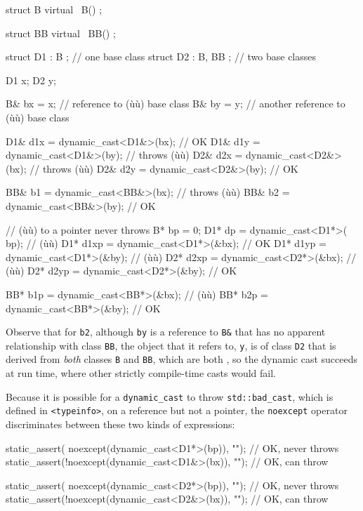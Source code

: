 \begin{emcppslisting}[emcppsbatch=e1]
struct B
{
   virtual ~B() {}
};

struct BB
{
   virtual ~BB() {}
};

struct D1 : B     { };  // one base class
struct D2 : B, BB { };  // two base classes

D1 x;
D2 y;

B& bx = x;  // reference to (ù{}ù) base class
B& by = y;  // another reference to (ù{}ù) base class

D1& d1x = dynamic_cast<D1&>(bx);    // OK
D1& d1y = dynamic_cast<D1&>(by);    // throws (ù{}ù)
D2& d2x = dynamic_cast<D2&>(bx);    // throws (ù{}ù)
D2& d2y = dynamic_cast<D2&>(by);    // OK

BB& b1 = dynamic_cast<BB&>(bx);     // throws (ù{}ù)
BB& b2 = dynamic_cast<BB&>(by);     // OK

// (ù{}ù) to a pointer never throws
B*  bp   = 0;
D1* dp   = dynamic_cast<D1*>( bp);  // (ù{}ù)
D1* d1xp = dynamic_cast<D1*>(&bx);  // OK
D1* d1yp = dynamic_cast<D1*>(&by);  // (ù{}ù)
D2* d2xp = dynamic_cast<D2*>(&bx);  // (ù{}ù)
D2* d2yp = dynamic_cast<D2*>(&by);  // OK

BB* b1p = dynamic_cast<BB*>(&bx);   // (ù{}ù)
BB* b2p = dynamic_cast<BB*>(&by);   // OK
\end{emcppslisting}
    

\noindent Observe that for \lstinline!b2!, although \lstinline!by! is a reference to
\lstinline!B&! that has no apparent relationship with class \lstinline!BB!,
the object that it refers to, \lstinline!y!, is of class \lstinline!D2! that
is derived from \emph{both} classes \lstinline!B! and \lstinline!BB!, which
are both , so the dynamic cast succeeds at run
time, where other strictly compile-time casts would fail.

Because it is possible for a \lstinline!dynamic_cast! to throw
\lstinline!std::bad_cast!, which is defined in \lstinline!<typeinfo>!, on a
reference but not a pointer, the \lstinline!noexcept! operator
discriminates between these two kinds of expressions:

\begin{emcppslisting}[emcppsbatch=e1]
static_assert( noexcept(dynamic_cast<D1*>(bp)), "");  // OK, never throws
static_assert(!noexcept(dynamic_cast<D1&>(bx)), "");  // OK, can throw

static_assert( noexcept(dynamic_cast<D2*>(bp)), "");  // OK, never throws
static_assert(!noexcept(dynamic_cast<D2&>(bx)), "");  // OK, can throw
\end{emcppslisting}
    

